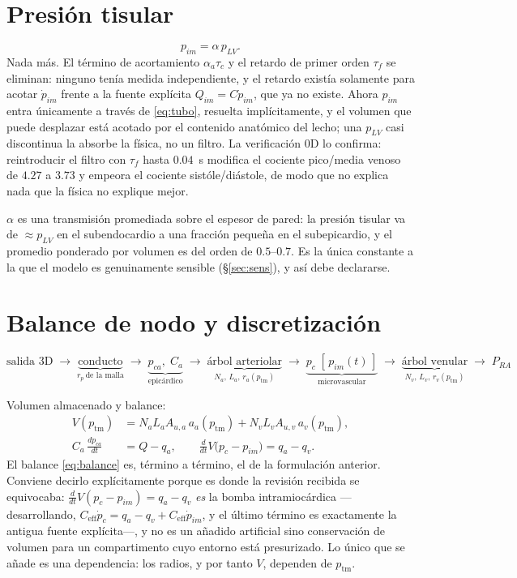 \documentclass[11pt]{article}
\newcommand{\ptm}{p_{\mathrm{tm}}}
\begin{document}
\section{Presi\'on tisular}

\begin{equation}
  p_{im}=\alpha\,p_{LV} .
  \label{eq:pim}
\end{equation}
Nada m\'as. El t\'ermino de acortamiento $\alpha_a\tau_c$ y el retardo de primer
orden $\tau_f$ se eliminan: ninguno ten\'ia medida independiente, y el retardo
exist\'ia solamente para acotar $\dot p_{im}$ frente a la fuente expl\'icita
$Q_{im}=C\dot p_{im}$, que ya no existe. Ahora $p_{im}$ entra \'unicamente a
trav\'es de \eqref{eq:tubo}, resuelta impl\'icitamente, y el volumen que puede
desplazar est\'a acotado por el contenido anat\'omico del lecho; una $p_{LV}$
casi discontinua la absorbe la f\'isica, no un filtro. La verificaci\'on 0D lo
confirma: reintroducir el filtro con $\tau_f$ hasta $0.04$~s modifica el
cociente pico/media venoso de $4.27$ a $3.73$ y empeora el cociente
sist\'ole/di\'astole, de modo que no explica nada que la f\'isica no explique
mejor.

$\alpha$ es una transmisi\'on promediada sobre el espesor de pared: la presi\'on
tisular va de $\approx p_{LV}$ en el subendocardio a una fracci\'on peque\~na en
el subepicardio, y el promedio ponderado por volumen es del orden de
$0.5$--$0.7$. Es la \'unica constante a la que el modelo es genuinamente
sensible (\S\ref{sec:sens}), y as\'i debe declararse.

\section{Balance de nodo y discretizaci\'on}

\[
\text{salida 3D}\;\rightarrow\;
\underbrace{\text{conducto}}_{r_p\ \text{de la malla}}\;\rightarrow\;
\underbrace{p_{ca},\;C_a}_{\text{epic\'ardico}}\;\rightarrow\;
\underbrace{\text{\'arbol arteriolar}}_{N_a,\,L_a,\,r_a(\ptm)}\;\rightarrow\;
\underbrace{p_c\;[\,p_{im}(t)\,]}_{\text{microvascular}}\;\rightarrow\;
\underbrace{\text{\'arbol venular}}_{N_v,\,L_v,\,r_v(\ptm)}\;\rightarrow\; P_{RA}
\]

\noindent
Volumen almacenado y balance:
\begin{align}
  V(\ptm) &= N_a L_a A_{u,a}\,a_a(\ptm)+N_v L_v A_{u,v}\,a_v(\ptm),
  \label{eq:V}\\[2pt]
  C_a\,\frac{dp_{ca}}{dt} &= Q-q_a,
  \qquad
  \frac{d}{dt}V\bigl(p_c-p_{im}\bigr)=q_a-q_v .
  \label{eq:balance}
\end{align}
El balance \eqref{eq:balance} es, t\'ermino a t\'ermino, el de la formulaci\'on
anterior. Conviene decirlo expl\'icitamente porque es donde la revisi\'on
recibida se equivocaba: $\tfrac{d}{dt}V(p_c-p_{im})=q_a-q_v$ \emph{es} la bomba
intramioc\'ardica ---desarrollando,
$C_{\text{eff}}\dot p_c=q_a-q_v+C_{\text{eff}}\dot p_{im}$, y el \'ultimo
t\'ermino es exactamente la antigua fuente expl\'icita---, y no es un
a\~nadido artificial sino conservaci\'on de volumen para un compartimento cuyo
entorno est\'a presurizado. Lo \'unico que se a\~nade es una dependencia: los
radios, y por tanto $V$, dependen de $\ptm$.
\end{document}

